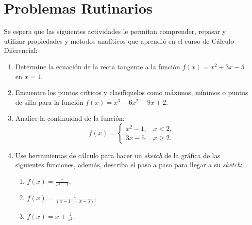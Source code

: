 \section{Problemas Rutinarios}

Se espera que las siguientes actividades le permitan comprender, repasar y utilizar propiedades y métodos analíticos que aprendió en el curso de Cálculo Diferencial:

\begin{enumerate}
    \item Determine la ecuación de la recta tangente a la función \(f(x)=x^2+3x-5\) en \(x=1\).
    \item Encuentre los puntos críticos y clasifíquelos como máximos, mínimos o puntos de silla para la función \(f(x)=x^3-6x^2+9x+2\).
    \item Analice la continuidad de la función:
    $$
    f(x)=\begin{cases}
    x^2-1, & x<2, \\
    3x-5, & x\geq 2.
    \end{cases}
    $$
    \item Use herramientas de cálculo para hacer un \emph{sketch} de la gráfica de las siguientes funciones, además, describa el paso a paso para llegar a su \emph{sketch}:
    \begin{enumerate}
        \item \(f(x)=\frac{x}{x^2-1}\),
        \item \(f(x)=\frac{1}{(x-1)(x-3)}\),
        \item \(f(x)=x+\frac{1}{x^2}\).
    \end{enumerate}
\end{enumerate}